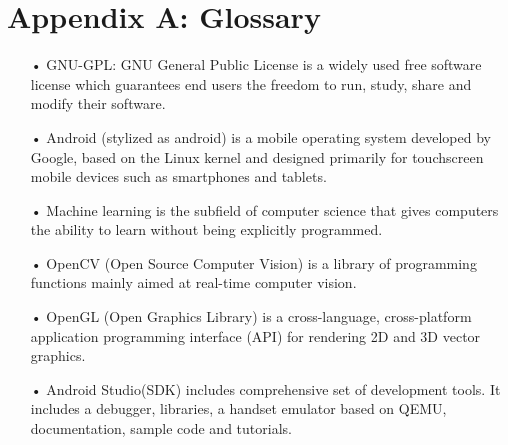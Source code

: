 \documentclass{scrreprt}
\begin{document}
\section{Appendix A: Glossary}
\begin{enumerate}
\item[•] GNU-GPL: GNU General Public License is a widely used free software license which guarantees end users the freedom to run, study, share and modify their software.

\item[•] Android (stylized as android) is a mobile operating system developed by Google, based on the Linux kernel and designed primarily for touchscreen mobile devices such as smartphones and tablets.

\item[•] Machine learning is the subfield of computer science that gives computers the ability to learn without being explicitly programmed.

\item[•] OpenCV (Open Source Computer Vision) is a library of programming functions mainly aimed at real-time computer vision.

\item[•] OpenGL (Open Graphics Library) is a cross-language, cross-platform application programming interface (API) for rendering 2D and 3D vector graphics.

\item[•] Android Studio(SDK) includes comprehensive set of development tools. It includes a debugger, libraries, a handset emulator based on QEMU, documentation, sample code and tutorials.
\end{enumerate}
\end{document}
